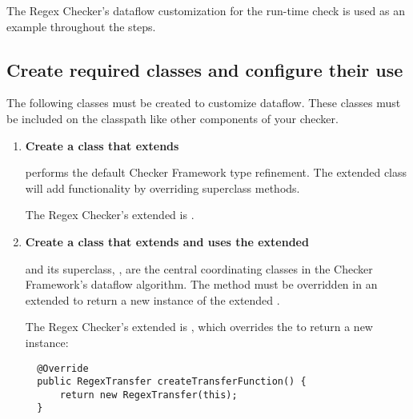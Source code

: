 The Regex Checker's dataflow customization for the
run-time check is used as an example throughout the steps.


\subsection{Create required classes and configure their
  use\label{dataflow-create-classes}}

The following classes must be created to customize dataflow. These classes must
be included on the classpath like other components of your checker.

\begin{enumerate}
\item \textbf{Create a class that extends
    }

   performs the default Checker
  Framework type refinement.  The extended class will add functionality by
  overriding superclass methods.

  The Regex Checker's extended  is
  .

\item \textbf{Create a class that extends
     and uses the extended
    }

  \begin{sloppypar}
   and its superclass,
  , are the central coordinating classes
  in the Checker Framework's dataflow algorithm. The
   method must be overridden in an extended
   to return a new instance of the
  extended .
  \end{sloppypar}

  \begin{sloppypar}
  The Regex Checker's extended  is
  , which overrides the
   to return a new
   instance:
  \end{sloppypar}

\begin{smaller}
\begin{Verbatim}
  @Override
  public RegexTransfer createTransferFunction() {
      return new RegexTransfer(this);
  }
\end{Verbatim}
\end{smaller}


\end{enumerate}
